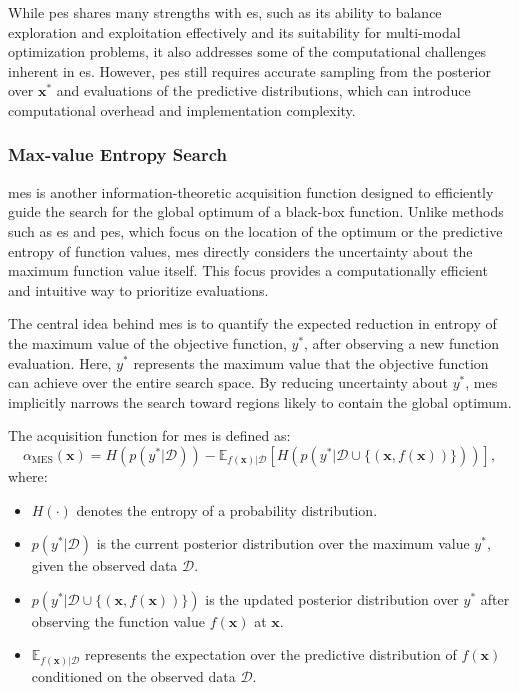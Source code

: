 While \ac{pes} shares many strengths with \ac{es}, such as its ability to balance exploration and exploitation effectively and its suitability for multi-modal optimization problems, it also addresses some of the computational challenges inherent in \ac{es}. However, \ac{pes} still requires accurate sampling from the posterior over $\mathbf{x}^*$ and evaluations of the predictive distributions, which can introduce computational overhead and implementation complexity.

\subsubsection{Max-value Entropy Search}
\label{section:max_value_entropy_search}

\acf{mes} \citep{wang2017max} is another information-theoretic acquisition function designed to efficiently guide the search for the global optimum of a black-box function. Unlike methods such as \ac{es} and \ac{pes}, which focus on the location of the optimum or the predictive entropy of function values, \ac{mes} directly considers the uncertainty about the maximum function value itself. This focus provides a computationally efficient and intuitive way to prioritize evaluations.

The central idea behind \ac{mes} is to quantify the expected reduction in entropy of the maximum value of the objective function, $y^*$, after observing a new function evaluation. Here, $y^*$ represents the maximum value that the objective function can achieve over the entire search space. By reducing uncertainty about $y^*$, \ac{mes} implicitly narrows the search toward regions likely to contain the global optimum.

The acquisition function for \ac{mes} is defined as:
\begin{equation}
    \alpha_{\text{MES}}(\mathbf{x}) = H(p(y^*|\mathcal{D})) - \mathbb{E}_{f(\mathbf{x})|\mathcal{D}} \left[ H(p(y^*|\mathcal{D} \cup \{(\mathbf{x}, f(\mathbf{x}))\})) \right],
\end{equation}
where:
\begin{itemize}
    \item $H(\cdot)$ denotes the entropy of a probability distribution.
    \item $p(y^*|\mathcal{D})$ is the current posterior distribution over the maximum value $y^*$, given the observed data $\mathcal{D}$.
    \item $p(y^*|\mathcal{D} \cup \{(\mathbf{x}, f(\mathbf{x}))\})$ is the updated posterior distribution over $y^*$ after observing the function value $f(\mathbf{x})$ at $\mathbf{x}$.
    \item $\mathbb{E}_{f(\mathbf{x})|\mathcal{D}}$ represents the expectation over the predictive distribution of $f(\mathbf{x})$ conditioned on the observed data $\mathcal{D}$.
\end{itemize}

